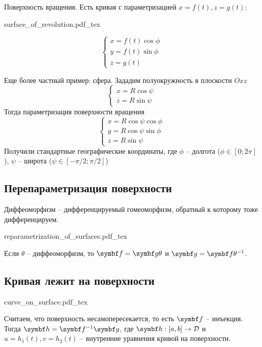 \documentclass[main]{subfiles}
\begin{document}
\begin{example}
    Поверхность вращения.
    Есть кривая с параметризацией $x = f(t), z = g(t)$:

    \begin{minipage}{0.59\textwidth}
        {surface_of_revolution.pdf_tex}
    \end{minipage}
    \begin{minipage}{0.35\textwidth}
        \[\begin{cases}
                x = f(t) \cos \phi \\
                y = f(t) \sin \phi \\
                z = g(t)
            \end{cases}\]
    \end{minipage}
\end{example}
\begin{example}
    Еще более частный пример: сфера.
    Зададим полуокружность в плоскости $Oxz$
    \[\begin{cases}
            x = R \cos \psi \\
            z = R \sin \psi
        \end{cases}\]
    Тогда параметризация поверхности вращения
    \[\begin{cases}
            x = R \cos \psi \cos \phi \\
            y = R \cos \psi \sin \phi \\
            z = R \sin \psi
        \end{cases}\]
    Получили стандартные географические координаты, где
    $\phi$ -- долгота ($\phi \in [0;2 \pi]$), $\psi$ -- широта ($\psi \in [-\pi/2 ; \pi/2]$)
\end{example}

\subsection{Перепараметризация поверхности}
\begin{definition}[Диффеоморфизм]
    Диффеоморфизм -- дифференцируемый гомеоморфизм, обратный к которому тоже дифференцируем.
\end{definition}
\begin{center}
    {reparametrization_of_surfaces.pdf_tex}
\end{center}
Если $\theta$ -- диффеоморфизм, то $\vf = \vg \theta$ и $\vg = \vf \theta^{-1}$.

\subsection{Кривая лежит на поверхности}
\begin{center}
    {curve_on_surface.pdf_tex}
\end{center}
Считаем, что поверхность несамопересекается, то есть $\vf$ -- инъекция.
Тогда $\vh = \vf^{-1}\vg$, где $\vh: [a,b] \to \fancyD$ и $u = h_1(t), v = h_2(t)$ -- внутренние уравнения кривой на поверхности.
\end{document}
